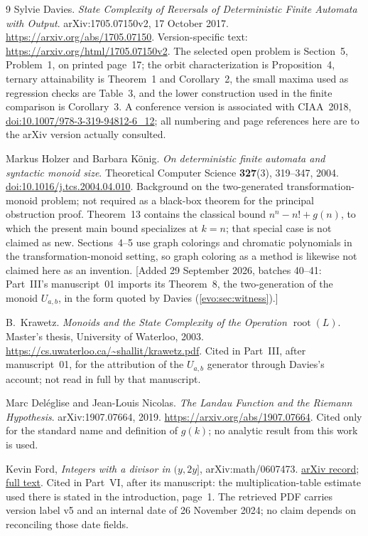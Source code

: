 \documentclass[11pt,a4paper]{article}
\numberwithin{equation}{section}
\theoremstyle{definition}
\theoremstyle{remark}
\begin{document}
\begin{thebibliography}{9}
Sylvie Davies.
\emph{State Complexity of Reversals of Deterministic Finite Automata with
Output}.
arXiv:1705.07150v2, 17 October 2017.
\url{https://arxiv.org/abs/1705.07150}.
Version-specific text: \url{https://arxiv.org/html/1705.07150v2}.
The selected open problem is Section~5, Problem~1, on printed page~17; the
orbit characterization is Proposition~4, ternary attainability is Theorem~1
and Corollary~2, the small maxima used as regression checks are Table~3, and
the lower construction used in the finite comparison is Corollary~3.
A conference version is associated with CIAA~2018,
\href{https://doi.org/10.1007/978-3-319-94812-6_12}%
{doi:10.1007/978-3-319-94812-6\_12}; all numbering and page references here
are to the arXiv version actually consulted.

Markus Holzer and Barbara K\"onig.
\emph{On deterministic finite automata and syntactic monoid size}.
Theoretical Computer Science \textbf{327}(3), 319--347, 2004.
\href{https://doi.org/10.1016/j.tcs.2004.04.010}{doi:10.1016/j.tcs.2004.04.010}.
Background on the two-generated transformation-monoid problem; not required
as a black-box theorem for the principal obstruction proof. Theorem~13
contains the classical bound $n^n-n!+g(n)$, to which the present main bound
specializes at $k=n$; that special case is not claimed as new. Sections~4--5
use graph colorings and chromatic polynomials in the transformation-monoid
setting, so graph coloring as a method is likewise not claimed here as an
invention. [Added 29 September 2026, batches 40--41: Part~III's manuscript~01 imports its Theorem~8,
the two-generation of the monoid $U_{a,b}$, in the form quoted by Davies
(\cref{evo:sec:witness}).]

B.~Krawetz.
\emph{Monoids and the State Complexity of the Operation $\operatorname{root}(L)$}.
Master's thesis, University of Waterloo, 2003.
\url{https://cs.uwaterloo.ca/~shallit/krawetz.pdf}.
Cited in Part~III, after manuscript~01, for the attribution of the $U_{a,b}$
generator through Davies's account; not read in full by that manuscript.

Marc Del\'eglise and Jean-Louis Nicolas.
\emph{The Landau Function and the Riemann Hypothesis}.
arXiv:1907.07664, 2019.
\url{https://arxiv.org/abs/1907.07664}.
Cited only for the standard name and definition of $g(k)$; no analytic
result from this work is used.

Kevin Ford,
\emph{Integers with a divisor in $(y,2y]$},
arXiv:math/0607473.
\href{https://arxiv.org/abs/math/0607473}{arXiv record};
\href{https://arxiv.org/pdf/math/0607473}{full text}.
Cited in Part~VI, after its manuscript: the multiplication-table estimate
used there is stated in the introduction, page~1. The retrieved PDF carries
version label v5 and an internal date of 26 November 2024; no claim depends
on reconciling those date fields.


\end{thebibliography}
\end{document}
